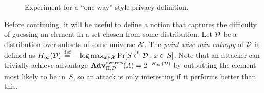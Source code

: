 \begin{figure}[tbh]
\centering
{}
\caption{Experiment for a ``one-way'' style privacy
  definition.}
\label{fig:privacy-ow}
\end{figure}


Before continuing, it will be useful to define a notion that captures the difficulty
of guessing an element in a set chosen from some distribution.
Let ${\cal D}$ be a distribution over subsets of some universe ${\cal X}$. The \emph{point-wise
min-entropy} of ${\cal D}$ is defined as
$H_\infty({\cal D}) \stackrel{\rm def}{=} -\log \max_{x \in {\cal X}} \Pr[S {\:\stackrel{{\scriptscriptstyle \hspace{0.2em}\$}} {\leftarrow}\:} {\cal D} : x \in S]$.
Note that an attacker can trivially achieve advantage
$\mathrm{\mathbf{Adv}}^{\mathrm{ow\mbox{-}rep}}_{\Pi,\mathcal{D}}(A)=2^{-H_\infty({\cal D})}$ by outputting the element most likely to be in~$S$,
so an attack is only interesting if it performs better than this.




 

